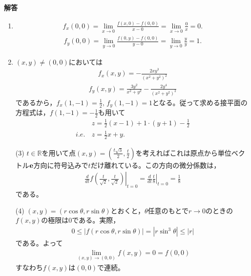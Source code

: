 \documentclass[a4paper,12pt,dvipdfmx,fleqn, oneside]{jsarticle}
\theoremstyle{defstyle}
\theoremstyle{thmx}
\theoremstyle{qesstyle}
\begin{document}
\begin{screen}
    \textbf{解答}

    \begin{enumerate}
        \item \begin{align*}
                  f_x(0,0)
                  = \lim_{x \to 0}\frac{f(x,0)-f(0,0)}{x-0}
                  = \lim_{x \to 0}\frac{0}{x}=0.
              \end{align*}
              \begin{align*}
                  f_y(0,0)
                  = \lim_{y \to 0}\frac{f(0,y)-f(0,0)}{y-0}
                  = \lim_{y \to 0}\frac{y}{y} = 1.
              \end{align*}
        \item $(x,y) \neq (0,0)$においては
              \begin{align*}
                  f_x(x,y)=-\frac{2xy^3}{(x^2+y^2)^2}
              \end{align*}
              \begin{align*}
                  f_y(x,y)=\frac{3y^2}{x^2+y^2}-\frac{2y^4}{(x^2+y^2)^2}
              \end{align*}
              であるから，$f_x(1,-1)=\frac{1}{2},\, f_y(1,-1)=1$となる。従って求める接平面の方程式は，$f(1,-1)=-\frac{1}{2}$も用いて
              \begin{align*}
                          & z = \frac{1}{2}(x-1)+1\cdot (y+1)-\frac{1}{2} \\
                  i.e. \, & z = \frac{1}{2}x +y.
              \end{align*}
    \end{enumerate}
\end{screen}
\begin{screen}
    \begin{enumerate}
        \item[(3)] $t \in \mathbb{R}$を用いて点$(x,y)=\left(\frac{t\sqrt{3}}{2},\frac{t}{2}\right)$を考えればこれは原点から単位ベクトル$\bf{e}$方向に符号込みで$t$だけ離れている。この方向の微分係数は，
            \begin{align*}
                \left. \frac{d}{dt} f\left(\frac{t}{\sqrt{2}},\frac{t}{\sqrt{2}}\right)\right|_{t=0} =\left. \frac{d}{dt} \frac{t}{8} \right|_{t=0} = \frac{1}{8}
            \end{align*}
            である。
        \item[(4)] $(x,y)=(r\cos \theta, r\sin \theta)$とおくと，$\theta$任意のもとで$r \to 0$のときの$f(x,y)$の極限は$0$である。実際，
            \begin{align*}
                0 \leq |f(r\cos \theta , r\sin \theta)|= |r \sin^3 \theta| \leq |r|
            \end{align*}
            である。よって
            \begin{align*}
                \lim_{(x,y)\to (0,0)}f(x,y) = 0 =f(0,0)
            \end{align*}
            すなわち$f(x,y)$は$(0,0)$で連続。
    \end{enumerate}
\end{screen}
\end{document}
